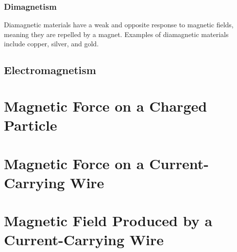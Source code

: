 			\subsubsection{Dimagnetism}  Diamagnetic materials have a weak and opposite response to magnetic fields, meaning they are repelled by a magnet. Examples of diamagnetic materials include copper, silver, and gold.
			
			
		\subsection{Electromagnetism}
	\section{Magnetic Force on a Charged Particle}
	\section{Magnetic Force on a Current-Carrying Wire}
	\section{Magnetic Field Produced by a Current-Carrying Wire}
	
	

		
	
	
	

	



